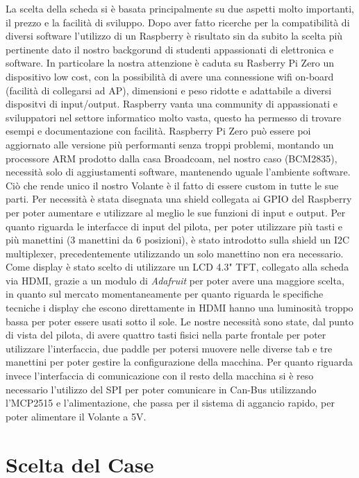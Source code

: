 La scelta della scheda si è basata principalmente su due aspetti molto importanti, il prezzo e la facilità di sviluppo.
Dopo aver fatto ricerche per la compatibilità di diversi software l'utilizzo di un Raspberry è risultato sin da subito la scelta 
più pertinente dato il nostro backgorund di studenti appassionati di elettronica e software.
In particolare la nostra attenzione è caduta su Rasberry Pi Zero un dispositivo low cost, con la possibilità di avere una connessione 
wifi on-board (facilità di collegarsi ad AP), dimensioni e peso ridotte e adattabile a diversi dispositvi di input/output.
Raspberry vanta una community di appassionati e sviluppatori nel settore informatico molto vasta, questo ha permesso di trovare 
esempi e documentazione con facilità.
Raspberry Pi Zero può essere poi aggiornato alle versione più performanti senza troppi problemi, montando un processore ARM 
prodotto dalla casa Broadcoam, nel nostro caso (BCM2835), necessità solo di aggiustamenti software, mantenendo uguale l'ambiente software.
Ciò che rende unico il nostro Volante è il fatto di essere custom in tutte le sue parti.
Per necessità è stata disegnata una shield collegata ai GPIO del Raspberry 
per poter aumentare e utilizzare al meglio le sue funzioni di input e output.
Per quanto riguarda le interfacce di input del pilota, per poter utilizzare più tasti e più manettini (3 manettini da 6 posizioni), 
è stato introdotto sulla shield un I2C multiplexer, precedentemente utilizzando un solo manettino non era necessario.
Come display è stato scelto di utilizzare un LCD 4.3" TFT, collegato alla scheda via HDMI, grazie a un modulo di \emph{Adafruit} per poter
avere una maggiore scelta, in quanto sul mercato momentaneamente per quanto riguarda le  specifiche tecniche i display che 
escono direttamente in HDMI hanno una luminosità troppo bassa per poter essere usati sotto il sole. 
Le nostre necessità sono state, dal punto di vista del pilota, di avere quattro tasti fisici nella parte frontale 
per poter utilizzare l'interfaccia, due paddle per potersi muovere nelle diverse tab e 
tre manettini per poter gestire la configurazione della macchina.
Per quanto riguarda invece l'interfaccia di comunicazione con il resto della macchina si è reso necessario l'utilizzo del SPI
per poter comunicare in Can-Bus utilizzando l'MCP2515 e l'alimentazione, che passa per il sistema di aggancio rapido, per poter alimentare il Volante a 5V.



\newpage


\section{Scelta del Case}

